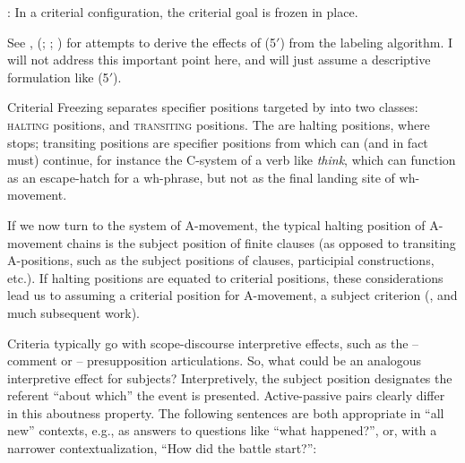 \documentclass[output=paper]{langsci/langscibook}
\begin{document}
\begin{exe}
     : In a criterial configuration, the criterial
    goal is frozen in place.\label{ex:key:21.5prime}
\z

See \textcite{Chomsky2013,Chomsky2015}, \citeauthor{Rizzi2015}
(\citeyear{Rizzi2015}; \citeyear{Rizzi2015b}; \citeyear{Rizzi2016a}) for
attempts to derive the effects of (5$'$) from the labeling algorithm. I will not
address this important point here, and will just assume a descriptive
formulation like (5$'$).

Criterial Freezing separates specifier positions
targeted by  into two classes: \textsc{halting} positions, and
\textsc{transiting} positions. The  are halting
positions, where  stops; transiting positions are specifier positions
from which  can (and in fact must) continue, for instance the C-system
of a verb like \emph{think}, which can function as an escape-hatch for a
wh-phrase, but not as the final landing site of wh-movement.

If we now turn to the system of A-movement, the typical halting position of
A-movement chains is the subject position of finite clauses (as opposed to
transiting A-positions, such as the subject positions of  clauses,
participial constructions, etc.). If halting positions are equated to criterial
positions, these considerations lead us to assuming a criterial position for
A-movement, a subject criterion (\citealt{rizzicriterial}, and much subsequent
work).

Criteria typically go with scope-discourse interpretive effects, such as the
 – comment or  – presupposition articulations. So, what could be an
analogous interpretive effect for subjects? Interpretively, the subject
position designates the referent “about which” the event is presented.
Active-passive pairs clearly differ in this aboutness property. The following
sentences are both appropriate in “all new” contexts, e.g., as answers to
questions like “what happened?”, or, with a narrower contextualization, “How
did the battle start?”:


\end{exe}
\end{document}
